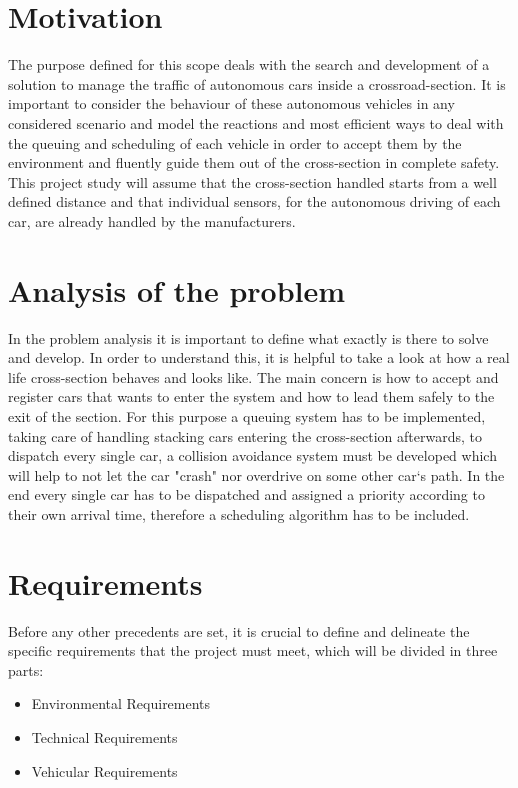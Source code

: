 \documentclass[conference]{IEEEtran}
\begin{document}
\section{Motivation}
The purpose defined for this scope deals with the search and development of a solution to manage the traffic of autonomous cars inside a crossroad-section. It is important to consider the behaviour of these autonomous vehicles in any considered scenario and model the reactions and most efficient ways to deal with the queuing and scheduling of each vehicle in order to accept them by the environment and fluently guide them out of the cross-section in complete safety. This project study will assume that the cross-section handled starts from a well defined distance and that individual sensors, for the autonomous driving of each car, are already handled by the manufacturers. 

\section{Analysis of the problem}
In the problem analysis it is important to define what exactly is there to solve and develop. In order to understand this, it is helpful to take a look at how a real life cross-section behaves and looks like. The main concern is how to accept and register cars that wants to enter the system and how to lead them safely to the exit of the section. For this purpose a queuing system has to be implemented, taking care of handling stacking cars entering the cross-section afterwards, to dispatch every single car, a collision avoidance system must be developed which will help to not let the car "crash" nor overdrive on some other car`s path. In the end every single car has to be dispatched and assigned a priority according to their own arrival time, therefore a scheduling algorithm has to be included.

\section{Requirements}
Before any other precedents are set, it is crucial to define and delineate the specific requirements that the project must meet, which will be divided in three parts:
\begin{itemize}
	\item Environmental Requirements
	\item Technical Requirements
	\item Vehicular Requirements
\end{itemize} 
\end{document}
